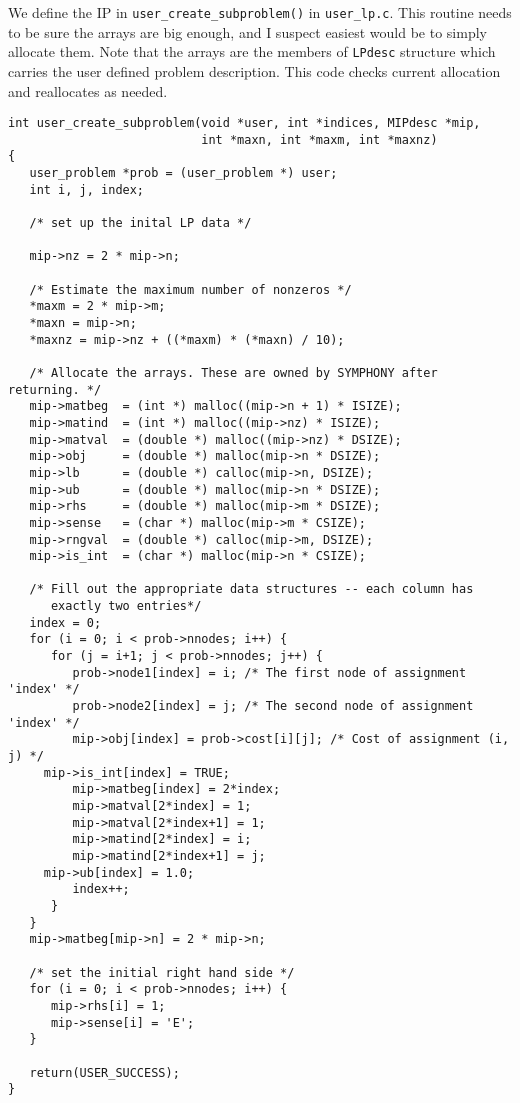 \documentclass[11pt]{article}
\begin{document}
We define the IP in \texttt{user\_create\_subproblem()} in
\texttt{user\_lp.c}. This routine needs to be sure the arrays are big enough,
and I suspect easiest would be to simply allocate them. Note that the arrays
are the members of \texttt{LPdesc} structure which carries the user defined
problem description. This code checks current allocation and reallocates as
needed.
\newpage
\begin{verbatim}
int user_create_subproblem(void *user, int *indices, MIPdesc *mip, 
                           int *maxn, int *maxm, int *maxnz)
{
   user_problem *prob = (user_problem *) user;
   int i, j, index;

   /* set up the inital LP data */

   mip->nz = 2 * mip->n;

   /* Estimate the maximum number of nonzeros */
   *maxm = 2 * mip->m;
   *maxn = mip->n;
   *maxnz = mip->nz + ((*maxm) * (*maxn) / 10);
   
   /* Allocate the arrays. These are owned by SYMPHONY after returning. */
   mip->matbeg  = (int *) malloc((mip->n + 1) * ISIZE);
   mip->matind  = (int *) malloc((mip->nz) * ISIZE);
   mip->matval  = (double *) malloc((mip->nz) * DSIZE);
   mip->obj     = (double *) malloc(mip->n * DSIZE);
   mip->lb      = (double *) calloc(mip->n, DSIZE);
   mip->ub      = (double *) malloc(mip->n * DSIZE);
   mip->rhs     = (double *) malloc(mip->m * DSIZE);
   mip->sense   = (char *) malloc(mip->m * CSIZE);
   mip->rngval  = (double *) calloc(mip->m, DSIZE);
   mip->is_int  = (char *) malloc(mip->n * CSIZE);
   
   /* Fill out the appropriate data structures -- each column has
      exactly two entries*/
   index = 0;
   for (i = 0; i < prob->nnodes; i++) {
      for (j = i+1; j < prob->nnodes; j++) {
         prob->node1[index] = i; /* The first node of assignment 'index' */
         prob->node2[index] = j; /* The second node of assignment 'index' */
         mip->obj[index] = prob->cost[i][j]; /* Cost of assignment (i, j) */
	 mip->is_int[index] = TRUE;
         mip->matbeg[index] = 2*index;
         mip->matval[2*index] = 1;
         mip->matval[2*index+1] = 1;
         mip->matind[2*index] = i;
         mip->matind[2*index+1] = j;
	 mip->ub[index] = 1.0;
         index++;
      }
   }
   mip->matbeg[mip->n] = 2 * mip->n;
   
   /* set the initial right hand side */
   for (i = 0; i < prob->nnodes; i++) {
      mip->rhs[i] = 1;
      mip->sense[i] = 'E';
   }

   return(USER_SUCCESS);
}      
\end{verbatim}
\end{document}
